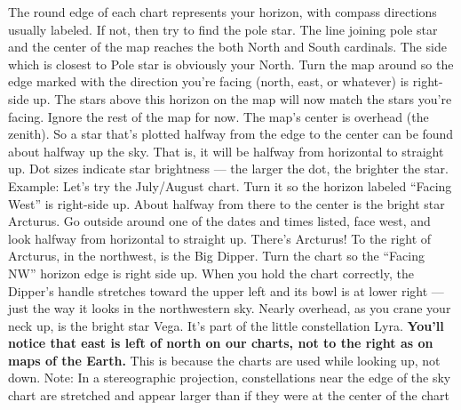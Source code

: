 \documentclass[a4paper,12pt]{extarticle}
\begin{document}
The round edge of each chart represents your horizon, with compass directions usually labeled. If not, then try to find the pole star. The line joining pole star and the center of the map reaches the both North and South cardinals. The side which is closest to Pole star is obviously your North. Turn the map around so the edge marked with the direction you’re facing (north, east, or whatever) is right-side up. The stars above this horizon on the map will now match the stars you’re facing. Ignore the rest of the map for now. The map’s center is overhead (the zenith). So a star that’s plotted halfway from the edge to the center can be found about halfway up the sky. That is, it will be halfway from horizontal to straight up. Dot sizes indicate star brightness — the larger the dot, the brighter the star. Example: Let’s try the July/August chart. Turn it so the horizon labeled “Facing West” is right-side up. About halfway from there to the center is the bright star Arcturus. Go outside around one of the dates and times listed, face west, and look halfway from horizontal to straight up. There’s Arcturus! To the right of Arcturus, in the northwest, is the Big Dipper. Turn the chart so the “Facing NW” horizon edge is right side up. When you hold the chart correctly, the Dipper’s handle stretches toward the upper left and its bowl is at lower right — just the way it looks in the northwestern sky. Nearly overhead, as you crane your neck up, is the bright star Vega. It’s part of the little constellation Lyra. \textbf{You’ll notice that east is left of north on our charts, not to the right as on maps of the Earth.} This is because the charts are used while looking up, not down. Note: In a stereographic projection, constellations near the edge of the sky chart are stretched and appear larger than if they were at the center of the chart
\end{document}
